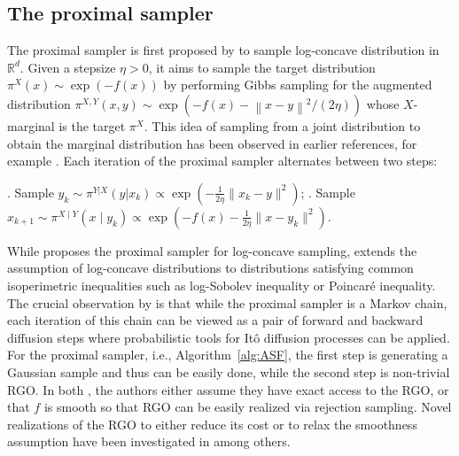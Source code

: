 \documentclass[11pt,letterpaper]{article}
\newcommand{\R}{\mathbb{R}}
\newcommand{\norm}[1]{\left\lVert #1 \right\rVert}
\newcommand{\brac}[1]{\left( #1\right)}
\begin{document}
\subsection{The proximal sampler}
The proximal sampler is first proposed by \cite{leestructured21} to sample log-concave distribution in $\R^d$. Given a stepsize $\eta>0$, it aims to sample the target distribution $\pi^X(x)\sim \exp(-f(x))$ by performing Gibbs sampling for the augmented distribution $\pi^{X,Y}(x,y)\sim \exp\brac{-f(x)-\norm{x-y}^2/(2\eta)}$ whose $X$-marginal is the target $\pi^X$. This idea of sampling from a joint distribution to obtain the marginal distribution has been observed in earlier references, for example \cite{cousins2018gaussian}. Each iteration of the proximal sampler alternates between two steps:
\begin{algorithm}[H]
	\caption{Proximal sampler by \cite{leestructured21}}
	\label{alg:ASF}
	\begin{algorithmic}
		. Sample $y_k\sim \pi^{Y|X}(y|x_k)\propto \exp(-\frac{1}{2\eta}\|x_k-y\|^2)$;
		. Sample $x_{k+1}\sim  \pi^{X \mid Y}(x \mid y_k)\propto \exp(-f(x)-\frac{1}{2\eta}\|x-y_k\|^2)$.
	\end{algorithmic}
\end{algorithm}
While \cite{leestructured21} proposes the proximal sampler for log-concave sampling, \cite{chen2022improved} extends the assumption of log-concave distributions to distributions satisfying common isoperimetric inequalities such as log-Sobolev inequality or Poincar\'{e} inequality. The crucial observation by \cite{chen2022improved} is that while the proximal sampler is a Markov chain, each iteration of this chain can be viewed as a pair of forward and backward diffusion steps where probabilistic tools for  It\^{o} diffusion processes can be applied. For the proximal sampler, i.e., Algorithm~\ref{alg:ASF}, the first step is generating a Gaussian sample and thus can be easily done, while the second step is non-trivial RGO. In both \cite{leestructured21,chen2022improved}, the authors either assume they have exact access to the RGO, or that $f$ is smooth so that RGO can be easily realized via rejection sampling. Novel realizations of the RGO to either reduce its cost or to relax the smoothness assumption have been investigated in \cite{liangchen2022proximal,gopi22a,fan2023improved,yuan2023class,liang2023a,liang2024proximal} among others. 
\end{document}
